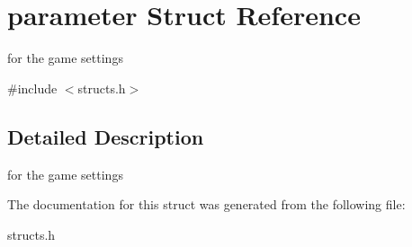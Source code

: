 \hypertarget{structparameter}{}\section{parameter Struct Reference}
\label{structparameter}


for the game settings  




{\ttfamily \#include $<$structs.\+h$>$}



\subsection{Detailed Description}
for the game settings 

The documentation for this struct was generated from the following file\+:\begin{DoxyCompactItemize}
\item 
structs.\+h\end{DoxyCompactItemize}
